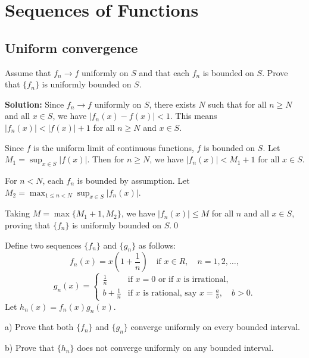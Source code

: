 \chapter{Sequences of Functions}

\section{Uniform convergence}



\begin{problembox}
Assume that \( f_n \to f \) uniformly on \( S \) and that each \( f_n \) is bounded on \( S \). Prove that \(\{f_n\}\) is uniformly bounded on \( S \).
\end{problembox}

\noindent\textbf{Solution:} Since \( f_n \to f \) uniformly on \( S \), there exists \( N \) such that for all \( n \geq N \) and all \( x \in S \), we have \( |f_n(x) - f(x)| < 1 \). This means \( |f_n(x)| < |f(x)| + 1 \) for all \( n \geq N \) and \( x \in S \).

Since \( f \) is the uniform limit of continuous functions, \( f \) is bounded on \( S \). Let \( M_1 = \sup_{x \in S} |f(x)| \). Then for \( n \geq N \), we have \( |f_n(x)| < M_1 + 1 \) for all \( x \in S \).

For \( n < N \), each \( f_n \) is bounded by assumption. Let \( M_2 = \max_{1 \leq n < N} \sup_{x \in S} |f_n(x)| \).

Taking \( M = \max\{M_1 + 1, M_2\} \), we have \( |f_n(x)| \leq M \) for all \( n \) and all \( x \in S \), proving that \(\{f_n\}\) is uniformly bounded on \( S \).\qed


\begin{problembox}
Define two sequences \(\{f_n\}\) and \(\{g_n\}\) as follows:
\[f_n(x) = x \left( 1 + \frac{1}{n} \right) \quad \text{if } x \in R, \quad n = 1, 2, \ldots,\]
\[g_n(x) = 
\begin{cases}
\frac{1}{n} & \text{if } x = 0 \text{ or if } x \text{ is irrational,} \\
b + \frac{1}{n} & \text{if } x \text{ is rational, say } x = \frac{a}{b}, \quad b > 0.
\end{cases}\]
Let \( h_n(x) = f_n(x) g_n(x) \).

a) Prove that both \(\{f_n\}\) and \(\{g_n\}\) converge uniformly on every bounded interval.

b) Prove that \(\{h_n\}\) does not converge uniformly on any bounded interval.
\end{problembox}

